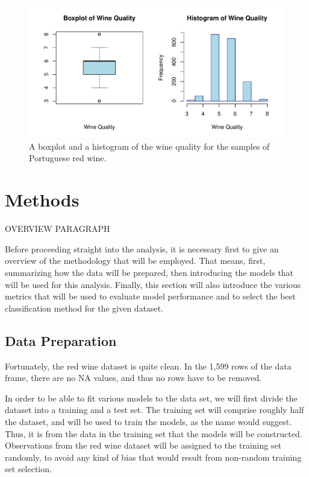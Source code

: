 \documentclass[12pt]{article}
\begin{document}
\begin{figure}[tbp]
 \centering
 \includegraphics[width=\textwidth]{manuscriptfigure.pdf}
 \caption{A boxplot and a histogram of the wine quality for the samples of Portuguese red wine.}
 \label{fig:wine}
\end{figure}

\section{Methods}
\label{sec:meth}

OVERVIEW PARAGRAPH

Before proceeding straight into the analysis, it is necessary first to give an 
overview of the methodology that will be employed.  That means, first, summarizing 
how the data will be prepared, then introducing the models that will be used for 
this analysis.  Finally, this section will also introduce the various metrics that 
will be used to evaluate model performance and to select the best classification 
method for the given dataset.  

\subsection{Data Preparation}
\label{sec:prep}

Fortunately, the red wine dataset is quite clean.  In the 1,599 rows of the data 
frame, there are no NA values, and thus no rows have to be removed.  

In order to be able to fit various models to the data set, we will first divide the 
dataset into a training and a test set.  The training set will comprise roughly half 
the dataset, and will be used to train the models, as the name would suggest.  Thus, 
it is from the data in the training set that the models will be constructed.  
Observations from the red wine dataset will be assigned to the training set randomly, 
to avoid any kind of bias that would result from non-random training set selection.  
\end{document}
